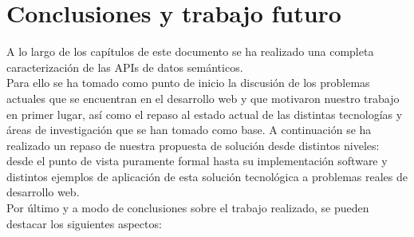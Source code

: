 \chapter{Conclusiones y trabajo futuro}

A lo largo de los cap\'itulos de este documento se ha realizado una completa caracterizaci\'on de las APIs de datos sem\'anticos.\\
Para ello se ha tomado como punto de inicio la discusi\'on de los problemas actuales que se encuentran en el desarrollo web y que motivaron nuestro trabajo en primer lugar, as\'i como el repaso al estado actual de las distintas tecnolog\'ias y \'areas de investigaci\'on que se han tomado como base. A continuaci\'on se ha realizado un repaso de nuestra propuesta de soluci\'on desde distintos niveles: desde el punto de vista puramente formal hasta su implementaci\'on software y distintos ejemplos de aplicaci\'on de esta soluci\'on tecnol\'ogica a problemas reales de desarrollo web.\\
Por \'ultimo y a modo de conclusiones sobre el trabajo realizado, se pueden destacar los siguientes aspectos:

